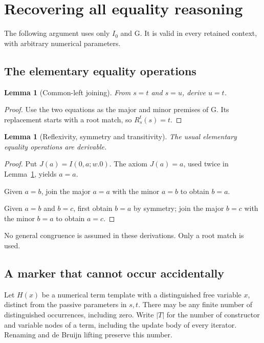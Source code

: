 \documentclass[11pt,letterpaper]{article}
\newtheorem{lemma}[theorem]{Lemma}
\theoremstyle{definition}
\theoremstyle{remark}
\newcommand{\Rep}[3]{R_{#1}^{#2}(#3)}
\begin{document}
\section{Recovering all equality reasoning}
\label{new:equality}

The following argument uses only $I_0$ and G. It is valid in every
retained context, with arbitrary numerical parameters.

\subsection{The elementary equality operations}

\begin{lemma}[Common-left joining]\label{new:join}
From $s=t$ and $s=u$, derive $u=t$.
\end{lemma}
\begin{proof}
Use the two equations as the major and minor premises of G. Its
replacement starts with a root match, so $\Rep{s}{t}{s}=t$.
\end{proof}

\begin{lemma}[Reflexivity, symmetry and transitivity]\label{new:algebra}
The usual elementary equality operations are derivable.
\end{lemma}
\begin{proof}
Put $J(a)=I(0,a;w.0)$. The axiom $J(a)=a$, used twice in
Lemma~\ref{new:join}, yields $a=a$.

Given $a=b$, join the major $a=a$ with the minor $a=b$ to obtain $b=a$.

Given $a=b$ and $b=c$, first obtain $b=a$ by symmetry; join the major
$b=c$ with the minor $b=a$ to obtain $a=c$.
\end{proof}

No general congruence is assumed in these derivations. Only a root
match is used.

\subsection{A marker that cannot occur accidentally}

Let $H(x)$ be a numerical term template with a distinguished free variable
$x$, distinct from the passive parameters in $s,t$. There may be any
finite number of distinguished occurrences, including zero.
Write $|T|$ for the number of constructor and variable nodes of a term,
including the update body of every iterator. Renaming and de Bruijn
lifting preserve this number.
\end{document}
